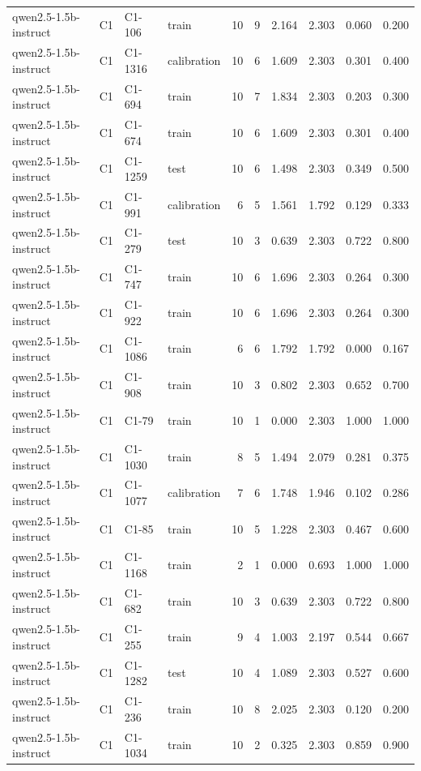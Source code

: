\begin{table}
\begin{tabular}{llllrrrrrr}
qwen2.5-1.5b-instruct & C1 & C1-106 & train & 10 & 9 & 2.164 & 2.303 & 0.060 & 0.200 \\
qwen2.5-1.5b-instruct & C1 & C1-1316 & calibration & 10 & 6 & 1.609 & 2.303 & 0.301 & 0.400 \\
qwen2.5-1.5b-instruct & C1 & C1-694 & train & 10 & 7 & 1.834 & 2.303 & 0.203 & 0.300 \\
qwen2.5-1.5b-instruct & C1 & C1-674 & train & 10 & 6 & 1.609 & 2.303 & 0.301 & 0.400 \\
qwen2.5-1.5b-instruct & C1 & C1-1259 & test & 10 & 6 & 1.498 & 2.303 & 0.349 & 0.500 \\
qwen2.5-1.5b-instruct & C1 & C1-991 & calibration & 6 & 5 & 1.561 & 1.792 & 0.129 & 0.333 \\
qwen2.5-1.5b-instruct & C1 & C1-279 & test & 10 & 3 & 0.639 & 2.303 & 0.722 & 0.800 \\
qwen2.5-1.5b-instruct & C1 & C1-747 & train & 10 & 6 & 1.696 & 2.303 & 0.264 & 0.300 \\
qwen2.5-1.5b-instruct & C1 & C1-922 & train & 10 & 6 & 1.696 & 2.303 & 0.264 & 0.300 \\
qwen2.5-1.5b-instruct & C1 & C1-1086 & train & 6 & 6 & 1.792 & 1.792 & 0.000 & 0.167 \\
qwen2.5-1.5b-instruct & C1 & C1-908 & train & 10 & 3 & 0.802 & 2.303 & 0.652 & 0.700 \\
qwen2.5-1.5b-instruct & C1 & C1-79 & train & 10 & 1 & 0.000 & 2.303 & 1.000 & 1.000 \\
qwen2.5-1.5b-instruct & C1 & C1-1030 & train & 8 & 5 & 1.494 & 2.079 & 0.281 & 0.375 \\
qwen2.5-1.5b-instruct & C1 & C1-1077 & calibration & 7 & 6 & 1.748 & 1.946 & 0.102 & 0.286 \\
qwen2.5-1.5b-instruct & C1 & C1-85 & train & 10 & 5 & 1.228 & 2.303 & 0.467 & 0.600 \\
qwen2.5-1.5b-instruct & C1 & C1-1168 & train & 2 & 1 & 0.000 & 0.693 & 1.000 & 1.000 \\
qwen2.5-1.5b-instruct & C1 & C1-682 & train & 10 & 3 & 0.639 & 2.303 & 0.722 & 0.800 \\
qwen2.5-1.5b-instruct & C1 & C1-255 & train & 9 & 4 & 1.003 & 2.197 & 0.544 & 0.667 \\
qwen2.5-1.5b-instruct & C1 & C1-1282 & test & 10 & 4 & 1.089 & 2.303 & 0.527 & 0.600 \\
qwen2.5-1.5b-instruct & C1 & C1-236 & train & 10 & 8 & 2.025 & 2.303 & 0.120 & 0.200 \\
qwen2.5-1.5b-instruct & C1 & C1-1034 & train & 10 & 2 & 0.325 & 2.303 & 0.859 & 0.900 \\

\end{tabular}
\end{table}
